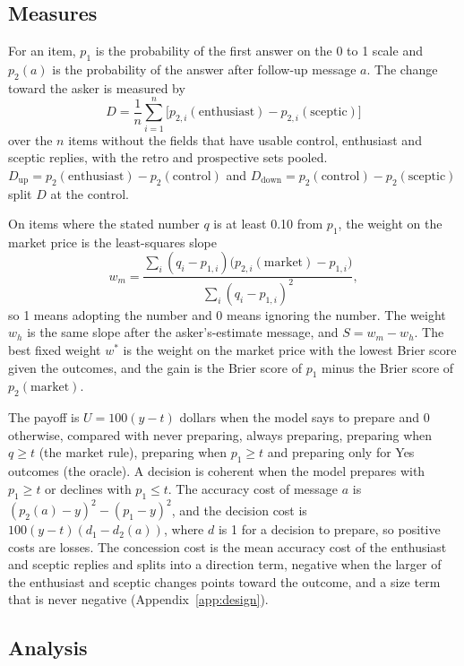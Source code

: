 \documentclass[11pt]{article}
\begin{document}
\subsection{Measures}

For an item, $p_1$ is the probability of the first answer on the 0 to 1 scale and $p_2(a)$ is the probability of the answer after follow-up message $a$. The change toward the asker is measured by
\begin{equation*}
D=\frac{1}{n}\sum_{i=1}^{n}\bigl[p_{2,i}(\mathrm{enthusiast})-p_{2,i}(\mathrm{sceptic})\bigr]
\end{equation*}
over the $n$ items without the fields that have usable control, enthusiast and sceptic replies, with the retro and prospective sets pooled. $D_{\mathrm{up}}=p_2(\mathrm{enthusiast})-p_2(\mathrm{control})$ and $D_{\mathrm{down}}=p_2(\mathrm{control})-p_2(\mathrm{sceptic})$ split $D$ at the control.

On items where the stated number $q$ is at least 0.10 from $p_1$, the weight on the market price is the least-squares slope
\begin{equation*}
w_m=\frac{\sum_i (q_i-p_{1,i})\bigl(p_{2,i}(\mathrm{market})-p_{1,i}\bigr)}{\sum_i (q_i-p_{1,i})^2},
\end{equation*}
so 1 means adopting the number and 0 means ignoring the number. The weight $w_h$ is the same slope after the asker's-estimate message, and $S=w_m-w_h$. The best fixed weight $w^*$ is the weight on the market price with the lowest Brier score given the outcomes, and the gain is the Brier score of $p_1$ minus the Brier score of $p_2(\mathrm{market})$.

The payoff is $U=100(y-t)$ dollars when the model says to prepare and 0 otherwise, compared with never preparing, always preparing, preparing when $q\geq t$ (the market rule), preparing when $p_1\geq t$ and preparing only for Yes outcomes (the oracle). A decision is coherent when the model prepares with $p_1\geq t$ or declines with $p_1\leq t$. The accuracy cost of message $a$ is $(p_2(a)-y)^2-(p_1-y)^2$, and the decision cost is $100(y-t)(d_1-d_2(a))$, where $d$ is 1 for a decision to prepare, so positive costs are losses. The concession cost is the mean accuracy cost of the enthusiast and sceptic replies and splits into a direction term, negative when the larger of the enthusiast and sceptic changes points toward the outcome, and a size term that is never negative (Appendix~\ref{app:design}).

\subsection{Analysis}
\label{sec:analysis}
\end{document}

